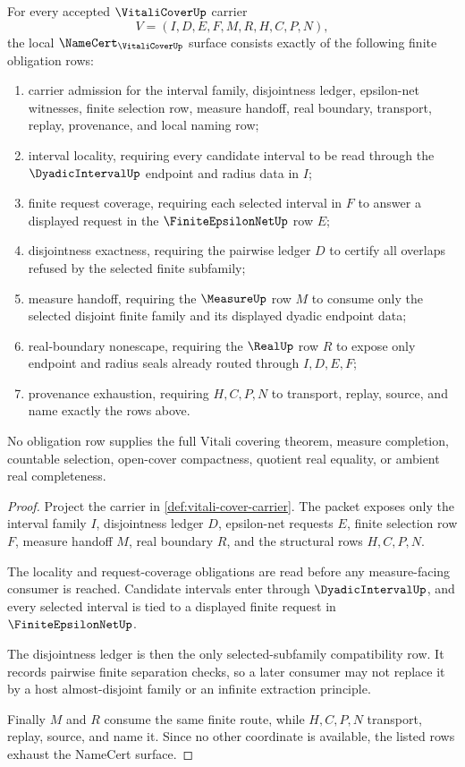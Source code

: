 \begin{theorem}
\label{thm:vitali-cover-namecert-obligations}
For every accepted $\VitaliCoverUp$ carrier
$$
V=(I,D,E,F,M,R,H,C,P,N),
$$
the local $\NameCert_{\VitaliCoverUp}$ surface consists exactly of the following finite obligation rows:
\begin{enumerate}
\item carrier admission for the interval family, disjointness ledger, epsilon-net witnesses, finite selection row, measure handoff, real boundary, transport, replay, provenance, and local naming row;
\item interval locality, requiring every candidate interval to be read through the $\DyadicIntervalUp$ endpoint and radius data in $I$;
\item finite request coverage, requiring each selected interval in $F$ to answer a displayed request in the $\FiniteEpsilonNetUp$ row $E$;
\item disjointness exactness, requiring the pairwise ledger $D$ to certify all overlaps refused by the selected finite subfamily;
\item measure handoff, requiring the $\MeasureUp$ row $M$ to consume only the selected disjoint finite family and its displayed dyadic endpoint data;
\item real-boundary nonescape, requiring the $\RealUp$ row $R$ to expose only endpoint and radius seals already routed through $I,D,E,F$;
\item provenance exhaustion, requiring $H,C,P,N$ to transport, replay, source, and name exactly the rows above.
\end{enumerate}
No obligation row supplies the full Vitali covering theorem, measure completion, countable selection, open-cover compactness, quotient real equality, or ambient real completeness.
\end{theorem}
\begin{proof}
Project the carrier in \autoref{def:vitali-cover-carrier}. The packet exposes only the interval family $I$, disjointness ledger $D$, epsilon-net requests $E$, finite selection row $F$, measure handoff $M$, real boundary $R$, and the structural rows $H,C,P,N$.

The locality and request-coverage obligations are read before any measure-facing consumer is reached. Candidate intervals enter through $\DyadicIntervalUp$, and every selected interval is tied to a displayed finite request in $\FiniteEpsilonNetUp$.

The disjointness ledger is then the only selected-subfamily compatibility row. It records pairwise finite separation checks, so a later consumer may not replace it by a host almost-disjoint family or an infinite extraction principle.

Finally $M$ and $R$ consume the same finite route, while $H,C,P,N$ transport, replay, source, and name it. Since no other coordinate is available, the listed rows exhaust the NameCert surface.
\end{proof}


